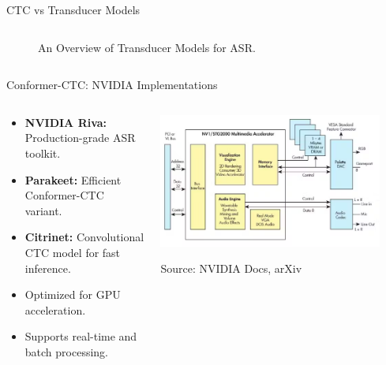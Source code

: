 \begin{frame}{CTC vs Transducer Models}
\begin{columns}
\begin{column}{0.5\textwidth}
\begin{figure}
                \caption*{An Overview of Transducer Models for ASR.}
            \end{figure}
        \end{column}
    \end{columns}
\end{frame}

\begin{frame}{Conformer-CTC: NVIDIA Implementations}
    \begin{columns}
        \begin{column}{0.5\textwidth}
            \begin{itemize}
                \setlength{\itemsep}{1.5em}
                \item \textbf{NVIDIA Riva:} Production-grade ASR toolkit.
                \item \textbf{Parakeet:} Efficient Conformer-CTC variant.
                \item \textbf{Citrinet:} Convolutional CTC model for fast inference.
                \item Optimized for GPU acceleration.
                \item Supports real-time and batch processing.
            \end{itemize}
        \end{column}
        \begin{column}{0.6\textwidth}
            \begin{center}
                \includegraphics[width=0.9\textwidth]{images/audio-nlp/nvidia-riva.png}
            \end{center}
            \tiny Source: NVIDIA Docs, arXiv
        \end{column}
    \end{columns}
\end{frame}


